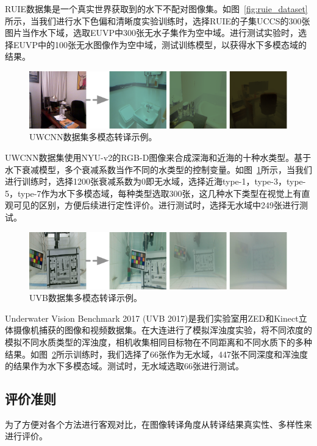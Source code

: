 RUIE数据集是一个真实世界获取到的水下不配对图像集。如图~\ref{fig:ruie_dataset}所示，当我们进行水下色偏和清晰度实验训练时，选择RUIE的子集UCCS的300张图片当作水下域，选取EUVP中300张无水子集作为空中域。进行测试实验时，选择EUVP中的100张无水图像作为空中域，测试训练模型，以获得水下多模态域的结果。

\begin{figure}[htp]
    \centering
	\includegraphics[width=\textwidth]{figures/uwcnn-dataset.pdf}
	\caption{UWCNN数据集多模态转译示例。}
	\label{fig:uwcnn_dataset}
\end{figure}

UWCNN数据集使用NYU-v2的RGB-D图像来合成深海和近海的十种水类型。基于水下衰减模型，多个衰减系数当作不同的水类型的控制变量。如图~\ref{fig:uwcnn_dataset}所示，当我们进行训练时，选择1200张衰减系数为0即无水域，选择近海type-1，type-3，type-5，type-7作为水下多模态域，每种类型选取300张，这几种水下类型在视觉上有直观可见的区别，方便后续进行定性评价。进行测试时，选择无水域中249张进行测试。

\begin{figure}[htp]
    \centering
	\includegraphics[width=\textwidth]{figures/uvb-dataset.pdf}
	\caption{UVB数据集多模态转译示例。}
	\label{fig:uvb_dataset}
\end{figure}

Underwater Vision Benchmark 2017 (UVB 2017)是我们实验室用ZED和Kinect立体摄像机捕获的图像和视频数据集。在大连进行了模拟浑浊度实验，将不同浓度的模拟不同水质类型的浑浊度，相机收集相同目标物在不同距离和不同水质下的多种结果。如图~\ref{fig:uvb_dataset}所示训练时，我们选择了66张作为无水域，447张不同深度和浑浊度的结果作为水下多模态域。测试时，无水域选取66张进行测试。

\subsection{评价准则}
为了方便对各个方法进行客观对比，在图像转译角度从转译结果真实性、多样性来进行评价。

